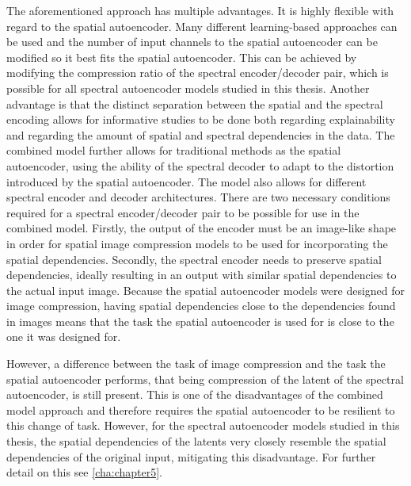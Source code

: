 The aforementioned approach has multiple advantages. It is highly flexible with regard to the spatial autoencoder. Many different learning-based approaches can be used and the number of input channels to the spatial autoencoder can be modified so it best fits the spatial autoencoder. This can be achieved by modifying the compression ratio of the spectral encoder/decoder pair, which is possible for all spectral autoencoder models studied in this thesis. Another advantage is that the distinct separation between the spatial and the spectral encoding allows for informative studies to be done both regarding explainability and regarding the amount of spatial and spectral dependencies in the data. The combined model further allows for traditional methods as the spatial autoencoder, using the ability of the spectral decoder to adapt to the distortion introduced by the spatial autoencoder. The model also allows for different spectral encoder and decoder architectures. There are two necessary conditions required for a spectral encoder/decoder pair to be possible for use in the combined model. Firstly, the output of the encoder must be an image-like shape in order for spatial image compression models to be used for incorporating the spatial dependencies. Secondly, the spectral encoder needs to preserve spatial dependencies, ideally resulting in an output with similar spatial dependencies to the actual input image. Because the spatial autoencoder models were designed for image compression, having spatial dependencies close to the dependencies found in images means that the task the spatial autoencoder is used for is close to the one it was designed for.

However, a difference between the task of image compression and the task the spatial autoencoder performs, that being compression of the latent of the spectral autoencoder, is still present. This is one of the disadvantages of the combined model approach and therefore requires the spatial autoencoder to be resilient to this change of task. However, for the spectral autoencoder models studied in this thesis, the spatial dependencies of the latents very closely resemble the spatial dependencies of the original input, mitigating this disadvantage. For further detail on this see \autoref{cha:chapter5}.

